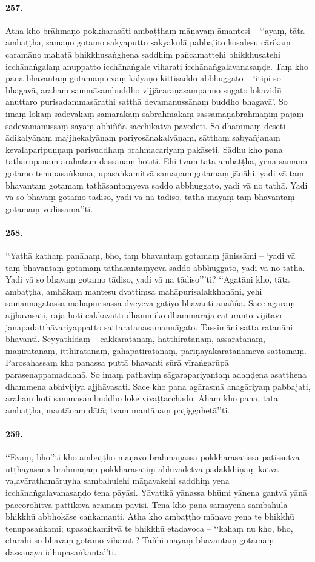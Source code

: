 \paragraph{257.} Atha kho brāhmaṇo pokkharasāti ambaṭṭhaṃ māṇavaṃ āmantesi – ‘‘ayaṃ, tāta ambaṭṭha, samaṇo gotamo sakyaputto sakyakulā pabbajito kosalesu cārikaṃ caramāno mahatā bhikkhusaṅghena saddhiṃ pañcamattehi bhikkhusatehi icchānaṅgalaṃ anuppatto icchānaṅgale viharati icchānaṅgalavanasaṇḍe. Taṃ kho pana bhavantaṃ gotamaṃ evaṃ kalyāṇo kittisaddo abbhuggato – ‘itipi so bhagavā, arahaṃ sammāsambuddho vijjācaraṇasampanno sugato lokavidū anuttaro purisadammasārathi satthā devamanussānaṃ buddho bhagavā’. So imaṃ lokaṃ sadevakaṃ samārakaṃ sabrahmakaṃ sassamaṇabrāhmaṇiṃ pajaṃ sadevamanussaṃ sayaṃ abhiññā sacchikatvā pavedeti. So dhammaṃ deseti ādikalyāṇaṃ majjhekalyāṇaṃ pariyosānakalyāṇaṃ, sātthaṃ sabyañjanaṃ kevalaparipuṇṇaṃ parisuddhaṃ brahmacariyaṃ pakāseti. Sādhu kho pana tathārūpānaṃ arahataṃ dassanaṃ hotīti. Ehi tvaṃ tāta ambaṭṭha, yena samaṇo gotamo tenupasaṅkama; upasaṅkamitvā samaṇaṃ gotamaṃ jānāhi, yadi vā taṃ bhavantaṃ gotamaṃ tathāsantaṃyeva saddo abbhuggato, yadi vā no tathā. Yadi vā so bhavaṃ gotamo tādiso, yadi vā na tādiso, tathā mayaṃ taṃ bhavantaṃ gotamaṃ vedissāmā’’ti.

\paragraph{258.} ‘‘Yathā kathaṃ panāhaṃ, bho, taṃ bhavantaṃ gotamaṃ jānissāmi – ‘yadi vā taṃ bhavantaṃ gotamaṃ tathāsantaṃyeva saddo abbhuggato, yadi vā no tathā. Yadi vā so bhavaṃ gotamo tādiso, yadi vā na tādiso’’’ti? ‘‘Āgatāni kho, tāta ambaṭṭha, amhākaṃ mantesu dvattiṃsa mahāpurisalakkhaṇāni, yehi samannāgatassa mahāpurisassa dveyeva gatiyo bhavanti anaññā. Sace agāraṃ ajjhāvasati, rājā hoti cakkavattī dhammiko dhammarājā cāturanto vijitāvī janapadatthāvariyappatto sattaratanasamannāgato. Tassimāni satta ratanāni bhavanti. Seyyathidaṃ – cakkaratanaṃ, hatthiratanaṃ, assaratanaṃ, maṇiratanaṃ, itthiratanaṃ, gahapatiratanaṃ, pariṇāyakaratanameva sattamaṃ. Parosahassaṃ kho panassa puttā bhavanti sūrā vīraṅgarūpā parasenappamaddanā. So imaṃ pathaviṃ sāgarapariyantaṃ adaṇḍena asatthena dhammena abhivijiya ajjhāvasati. Sace kho pana agārasmā anagāriyaṃ pabbajati, arahaṃ hoti sammāsambuddho loke vivaṭṭacchado. Ahaṃ kho pana, tāta ambaṭṭha, mantānaṃ dātā; tvaṃ mantānaṃ paṭiggahetā’’ti.

\paragraph{259.} ‘‘Evaṃ, bho’’ti kho ambaṭṭho māṇavo brāhmaṇassa pokkharasātissa paṭissutvā uṭṭhāyāsanā brāhmaṇaṃ pokkharasātiṃ abhivādetvā padakkhiṇaṃ katvā vaḷavārathamāruyha sambahulehi māṇavakehi saddhiṃ yena icchānaṅgalavanasaṇḍo tena pāyāsi. Yāvatikā yānassa bhūmi yānena gantvā yānā paccorohitvā pattikova ārāmaṃ pāvisi. Tena kho pana samayena sambahulā bhikkhū abbhokāse caṅkamanti. Atha kho ambaṭṭho māṇavo yena te bhikkhū tenupasaṅkami; upasaṅkamitvā te bhikkhū etadavoca – ‘‘kahaṃ nu kho, bho, etarahi so bhavaṃ gotamo viharati? Tañhi mayaṃ bhavantaṃ gotamaṃ dassanāya idhūpasaṅkantā’’ti.

